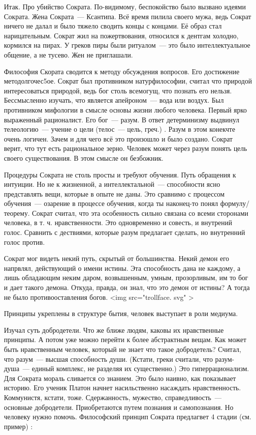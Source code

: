 Итак. Про убийство Сократа. По-видимому, беспокойство было вызвано идеями Сократа. 
Жена Сократа~--- Ксантипа. Всё время пилила своего мужа, ведь Сократ ничего не далал и было тяжело сводить концы с концами. Её образ стал нарицательным. 
Сократ жил на пожертвования, относился к дентгам холодно, кормился на пирах. У греков пиры были ритуалом~--- это было интеллектуальное общение, а не тусево. Жен не приглашали. 

Философия Скората сводится к методу обсуждения вопросов. Его достижение методолгочес5ое. 
Сократ был противником натурфилософии, считал что природой интересоваться природой, ведь бог столь всемогущ, что познать его нельзя. Бессмысленно изучать, что является апейроном~--- вода или воздух. 
Был противником мифологии в смысле основы жизни любого человека. Первый ярко выраженный рационалист. Его бог~--- разум. В ответ детерминизму выдвинул телеологию~--- учение о цели (телос~--- цель, греч.) . 
Разум в этом конекчте очень логичен. Зачем и для чего всё это произошло и было создано. Сократ верит, что тут есть рациональное зерно. Человек может через разум понять цель своего существования. В этом смысле он безбожник. 

Процедуры Сократа не столь просты и требуют обучения. Путь обращения к интуиции. Но не к жизненной, а интеллектальной~--- способности ясно представлять вещи, которые в опыте не даны. 
Это сравнимо с процессом обучения~--- озарение в процессе обучения, когда ты наконец-то понял формулу/теорему. Сократ считал, что эта особенность сильно связана со всеми сторонами человека, в т. ч. нравственности. 
Это одновременно и совесть, и внутрений голос. Сравнить с дествиями, которые разум предлагает сделать, но внутренний голос против. 

Сократ мог видеть некий путь, скрытый от большинства. Некий демон его напрвлял, действующий о имени истины. Эта способность дана не каждому, а лишь обладающим неким даром, возвышенным, умным, прозорливым, им то бог и дает такого демона. 
Откуда, правда, он знал, что это демон от истины? А тогда не было противооставления богов. <img src="trollface. svg" >

Принципы укреплены в структуре бытия, человек выступает в роли медиума. 

Изучал суть добродетели. Что же ближе людям, каковы их нравственные принципы. А потом уже можно перейти к более абстрактным вещам. 
Как может быть нравственным человек, который не знает что такое добродетель? Считал, что разум~--- высшая способность души. (Кстати, греки считали, что разум-душа~--- единый комплекс, не разделяя их существенно.) Это гиперрационализм. 
Для Сократа мораль сливается со знанием. Это было наивно, как показывает историю. Его ученик Платон начнет насильственно насаждать нравственность. Коммунистя, кстати, тоже. 
Сдержанность, мужество, справедливость~--- основные добродетели. Приобретаются путем познания и самопознания. Но человеку нужно помочь. 
Философский принцип Сократа предлагвет 4 стадии (см. пример) :


